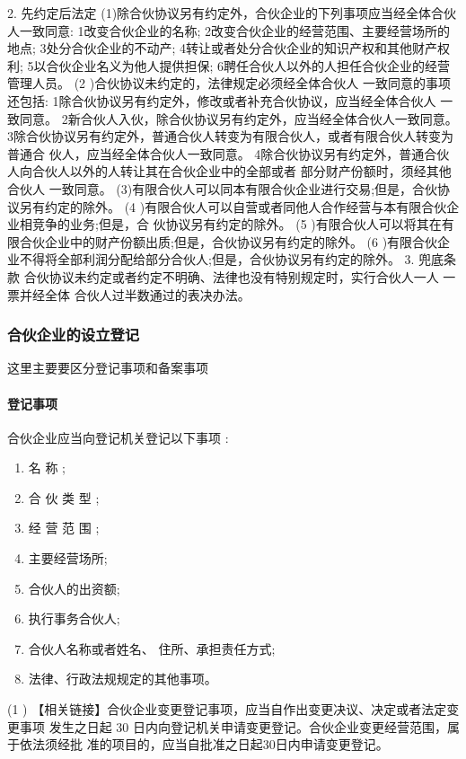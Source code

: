 \documentclass[UTF8,12pt]{ctexart}
\numberwithin{equation}{section} %
\numberwithin{figure}{section}
\numberwithin{table}{section}
\begin{document}
	
	2. 先约定后法定 (1)除合伙协议另有约定外，合伙企业的下列事项应当经全体合伙人一致同意: 1改变合伙企业的名称;
	2改变合伙企业的经营范围、主要经营场所的地点;
	3处分合伙企业的不动产;
	4转让或者处分合伙企业的知识产权和其他财产权利; 5以合伙企业名义为他人提供担保; 6聘任合伙人以外的人担任合伙企业的经营管理人员。
	(2 )合伙协议未约定的，法律规定必须经全体合伙人 一致同意的事项还包括: 1除合伙协议另有约定外，修改或者补充合伙协议，应当经全体合伙人 一致同意。 2新合伙人入伙，除合伙协议另有约定外，应当经全体合伙人一致同意。 3除合伙协议另有约定外，普通合伙人转变为有限合伙人，或者有限合伙人转变为普通合 伙人，应当经全体合伙人一致同意。 4除合伙协议另有约定外，普通合伙人向合伙人以外的人转让其在合伙企业中的全部或者 部分财产份额时，须经其他合伙人 一致同意。 (3)有限合伙人可以同本有限合伙企业进行交易;但是，合伙协议另有约定的除外。
	(4 )有限合伙人可以自营或者同他人合作经营与本有限合伙企业相竞争的业务;但是，合 伙协议另有约定的除外。
	(5 )有限合伙人可以将其在有限合伙企业中的财产份额出质;但是，合伙协议另有约定的除外。 (6 )有限合伙企业不得将全部利润分配给部分合伙人;但是，合伙协议另有约定的除外。 3. 兜底条款
	合伙协议未约定或者约定不明确、法律也没有特别规定时，实行合伙人一人 一票并经全体 合伙人过半数通过的表决办法。
	
	
	\subsubsection{合伙企业的设立登记}
	这里主要要区分登记事项和备案事项
	

	\paragraph{登记事项}
	合伙企业应当向登记机关登记以下事项 :
	\begin{enumerate}
		\item 名 称 ;
		
		\item 合 伙 类 型 ;
		
		\item 经 营 范 围 ; 
		
		\item 主要经营场所;
		
		\item 合伙人的出资额;
		
		\item 执行事务合伙人;
		
		\item 合伙人名称或者姓名、 住所、承担责任方式;
		
		\item 法律、行政法规规定的其他事项。
	\end{enumerate}(1 ) 
	【相关链接】合伙企业变更登记事项，应当自作出变更决议、决定或者法定变更事项 发生之日起 30 日内向登记机关申请变更登记。合伙企业变更经营范围，属于依法须经批 准的项目的，应当自批准之日起30日内申请变更登记。
	
\end{document}
